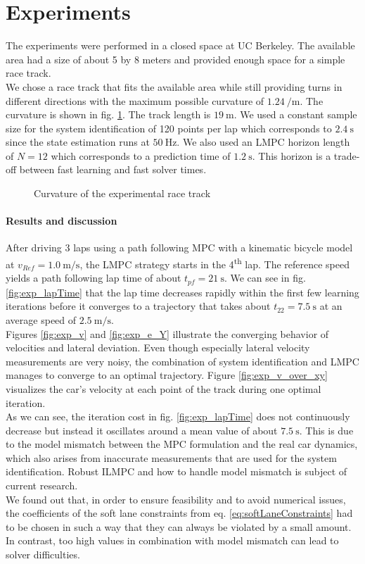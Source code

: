 \section{Experiments}
The experiments were performed in a closed space at UC Berkeley. The available area had a size of about 5 by 8 meters and provided enough space for a simple race track.\\
We chose a race track that fits the available area while still providing turns in different directions with the maximum possible curvature of $\SI{1.24}{\per\meter}$. The curvature is shown in fig. \ref{fig:exp_curv}. The track length is $\SI{19}{\meter}$.
We used a constant sample size for the system identification of 120 points per lap which corresponds to $\SI{2.4}{\second}$ since the state estimation runs at $\SI{50}{\hertz}$. We also used an LMPC horizon length of $N=12$ which corresponds to a prediction time of $\SI{1.2}{\second}$. This horizon is a trade-off between fast learning and fast solver times.
\begin{figure}[ht]
    \centering
      
    \caption{Curvature of the experimental race track}
    \label{fig:exp_curv}
\end{figure}

\paragraph{Results and discussion}
After driving 3 laps using a path following MPC with a kinematic bicycle model at $v_{Ref}=\SI{1.0}{\meter\per\second}$, the LMPC strategy starts in the 4\textsuperscript{th} lap. The reference speed yields a path following lap time of about $t_{pf}=\SI{21}{\second}$. We can see in fig. \ref{fig:exp_lapTime} that the lap time decreases rapidly within the first few learning iterations before it converges to a trajectory that takes about $t_{22}=\SI{7.5}{\second}$ at an average speed of $\SI{2.5}{\meter\per\second}$.\\
Figures \ref{fig:exp_v} and \ref{fig:exp_e_Y} illustrate the converging behavior of velocities and lateral deviation. Even though especially lateral velocity measurements are very noisy, the combination of system identification and LMPC manages to converge to an optimal trajectory.
Figure \ref{fig:exp_v_over_xy} visualizes the car's velocity at each point of the track during one optimal iteration. \\
As we can see, the iteration cost in fig. \ref{fig:exp_lapTime} does not continuously decrease but instead it oscillates around a mean value of about $\SI{7.5}{\second}$. This is due to the model mismatch between the MPC formulation and the real car dynamics, which also arises from inaccurate measurements that are used for the system identification. Robust ILMPC and how to handle model mismatch is subject of current research.\\
We found out that, in order to ensure feasibility and to avoid numerical issues, the coefficients of the soft lane constraints from eq. \ref{eq:softLaneConstraints} had to be chosen in such a way that they can always be violated by a small amount. In contrast, too high values in combination with model mismatch can lead to solver difficulties.

